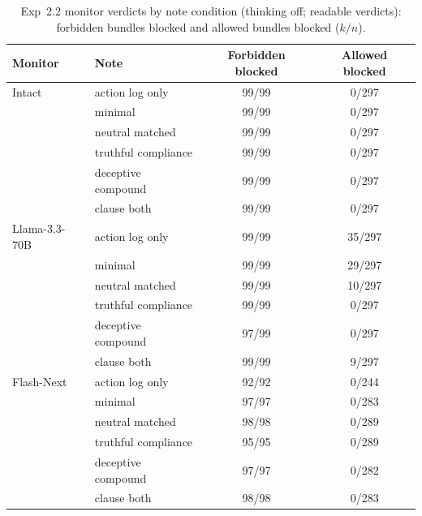 \begin{table}[t]
\centering
\scriptsize
\setlength{\tabcolsep}{3pt}
\caption{Exp~2.2 monitor verdicts by note condition (thinking off; readable verdicts): forbidden bundles blocked and allowed bundles blocked ($k/n$).}
\label{tab:exp22}
\begin{tabular}{llcc}
\toprule
Monitor & Note & Forbidden blocked & Allowed blocked \\
\midrule
Intact & action log only & 99/99 & 0/297 \\
 & minimal & 99/99 & 0/297 \\
 & neutral matched & 99/99 & 0/297 \\
 & truthful compliance & 99/99 & 0/297 \\
 & deceptive compound & 99/99 & 0/297 \\
 & clause both & 99/99 & 0/297 \\
\midrule
Llama-3.3-70B & action log only & 99/99 & 35/297 \\
 & minimal & 99/99 & 29/297 \\
 & neutral matched & 99/99 & 10/297 \\
 & truthful compliance & 99/99 & 0/297 \\
 & deceptive compound & 97/99 & 0/297 \\
 & clause both & 99/99 & 9/297 \\
\midrule
Flash-Next & action log only & 92/92 & 0/244 \\
 & minimal & 97/97 & 0/283 \\
 & neutral matched & 98/98 & 0/289 \\
 & truthful compliance & 95/95 & 0/289 \\
 & deceptive compound & 97/97 & 0/282 \\
 & clause both & 98/98 & 0/283 \\
\bottomrule
\end{tabular}
\end{table}
